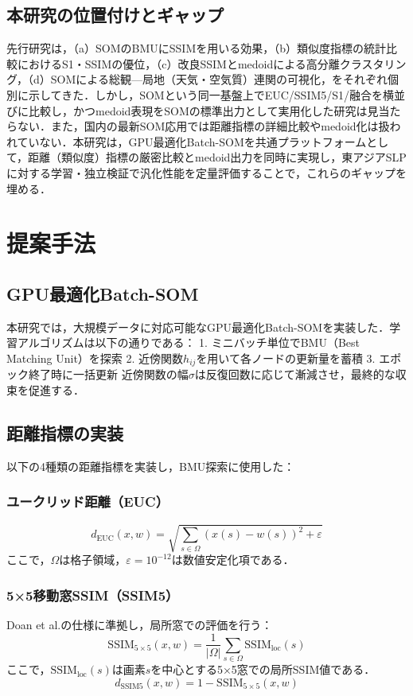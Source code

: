 \documentclass{jarticle}
\theoremstyle{definition}
\begin{document}
\subsection{本研究の位置付けとギャップ}
先行研究は，（a）SOMのBMUにSSIMを用いる効果\cite{doan2021s}，（b）類似度指標の統計比較におけるS1・SSIMの優位\cite{SATOTakuto20212021-047}，（c）改良SSIMとmedoidによる高分離クラスタリング\cite{winderlich2024classification}，（d）SOMによる総観—局地（天気・空気質）連関の可視化\cite{jiang2013classification}，をそれぞれ個別に示してきた．しかし，SOMという同一基盤上でEUC/SSIM5/S1/融合を横並びに比較し，かつmedoid表現をSOMの標準出力として実用化した研究は見当たらない．また，国内の最新SOM応用\cite{takasuka2024}では距離指標の詳細比較やmedoid化は扱われていない．本研究は，GPU最適化Batch-SOMを共通プラットフォームとして，距離（類似度）指標の厳密比較とmedoid出力を同時に実現し，東アジアSLPに対する学習・独立検証で汎化性能を定量評価することで，これらのギャップを埋める．
\section{提案手法}
\subsection{GPU最適化Batch-SOM}
本研究では，大規模データに対応可能なGPU最適化Batch-SOMを実装した．学習アルゴリズムは以下の通りである：
1. ミニバッチ単位でBMU（Best Matching Unit）を探索
2. 近傍関数$h_{ij}$を用いて各ノードの更新量を蓄積
3. エポック終了時に一括更新
近傍関数の幅$\sigma$は反復回数に応じて漸減させ，最終的な収束を促進する．
\subsection{距離指標の実装}
以下の4種類の距離指標を実装し，BMU探索に使用した：
\subsubsection{ユークリッド距離（EUC）}
\begin{equation}
d_{\mathrm{EUC}}(x,w) = \sqrt{\sum_{s\in\Omega} (x(s)-w(s))^2 + \varepsilon}
\end{equation}
ここで，$\Omega$は格子領域，$\varepsilon = 10^{-12}$は数値安定化項である．
\subsubsection{5×5移動窓SSIM（SSIM5）}
Doan et al.\cite{doan2021s}の仕様に準拠し，局所窓での評価を行う：
\begin{equation}
\mathrm{SSIM}_{5\times5}(x,w) = \frac{1}{|\Omega|}\sum_{s\in\Omega} \mathrm{SSIM}_{\mathrm{loc}}(s)
\end{equation}
ここで，$\mathrm{SSIM}_{\mathrm{loc}}(s)$は画素$s$を中心とする5×5窓での局所SSIM値である．
\begin{equation}
d_{\mathrm{SSIM5}}(x,w) = 1 - \mathrm{SSIM}_{5\times5}(x,w)
\end{equation}
\end{document}
